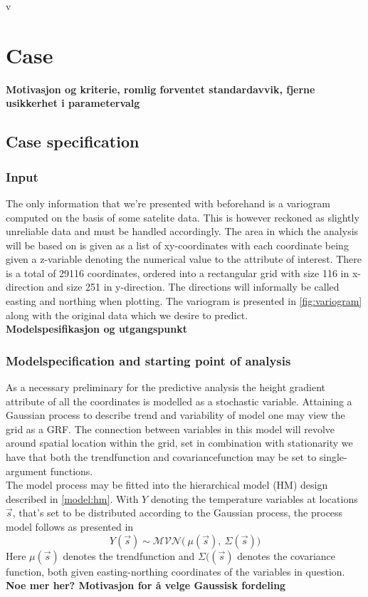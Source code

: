 v\section{Case}
\textbf{Motivasjon og kriterie, romlig forventet standardavvik, fjerne usikkerhet i parametervalg} \\
\subsection{Case specification} 

\subsubsection{Input}
The only information that we're presented with beforehand is a variogram computed on the basis of some satelite data. This is however reckoned as slightly unreliable data and must be handled accordingly. The area in which the analysis will be based on is given as a list of xy-coordinates with each coordinate being given a z-variable denoting the numerical value to the attribute of interest. There is a total of 29116 coordinates, ordered into a rectangular grid with size 116 in x-direction and size 251 in y-direction. The directions will informally be called easting and northing when plotting. The variogram is presented in \ref{fig:variogram} along with the original data which we desire to predict. \\

\textbf{Modelspesifikasjon og utgangspunkt} \\
\subsubsection{Modelspecification and starting point of analysis} \label{subs:model}
As a necessary preliminary for the predictive analysis the height gradient attribute of all the coordinates is modelled as a stochastic variable. Attaining a Gaussian process to describe trend and variability of model one may view the grid as a GRF. The connection between variables in this model will revolve around spatial location within the grid, set in combination with stationarity we have that both the trendfunction and covariancefunction may be set to single-argument functions. \\
The model process may be fitted into the hierarchical model (HM) design described in \ref{model:hm}. With $Y$ denoting the temperature variables at locations $\vec{s}$, that's set to be distributed according to the Gaussian process, the process model follows as presented in %
\begin{equation}
Y(\vec{s}) \sim \mathcal{MVN} \big( \ \mu(\vec{s}), \ \Sigma (\vec{s}) \big) 
\end{equation}
Here $\mu(\vec{s})$ denotes the trendfunction and $\Sigma((\vec{s})$ denotes the covariance function, both given easting-northing coordinates of the variables in question. \textbf{Noe mer her? Motivasjon for å velge Gaussisk fordeling} \\

